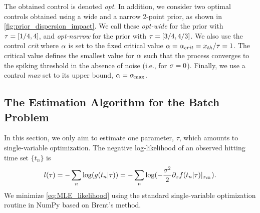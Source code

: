 \documentclass[12pt]{article}
\begin{document}
The obtained control is denoted  {\em opt}. In addition, we consider 
two optimal controls obtained using a wide and a narrow 2-point prior, as
shown in \cref{fig:prior_dispersion_impact}. We call these {\em opt-wide} for the
prior with ${ \tau } =  [1/4, 4]$, and {\em opt-narrow} for the prior with  ${ \tau } =  
[3/4, 4/3]$.  We also use the control {\em crit} where ${\alpha}$ is set to the fixed critical value 
${\alpha} = {\alpha}_{crit} = { x_{th} }/{ \tau } = 1$. The critical value defines the smallest
value for ${\alpha}$ such that the process converges to the spiking threshold in the
absence of noise (i.e., for ${\sigma }=0$). Finally, we use a control {\em
  max} set to its upper
bound, ${\alpha} = { {\alpha}_{\textrm{max}} }$.

\subsection{The Estimation Algorithm for the Batch Problem}

In this section, we only aim to estimate one parameter, $\tau$, which
amounts to single-variable optimization. The negative log-likelihood of an
observed hitting time set $\{t_n\}$ is
\begin{equation}
l({ \tau }) = - \sum_n \log ( g(t_n | { \tau }) ) =  - \sum_n \log ( -\frac{{\sigma }^2}2 {\partial}_x
f(t_n | { \tau }) |_{{ x_{th} }} ).
\label{eq:MLE_likelihood}
\end{equation}
We minimize \cref{eq:MLE_likelihood} using the standard single-variable
optimization routine in NumPy based on Brent's method.

% 
\end{document}
